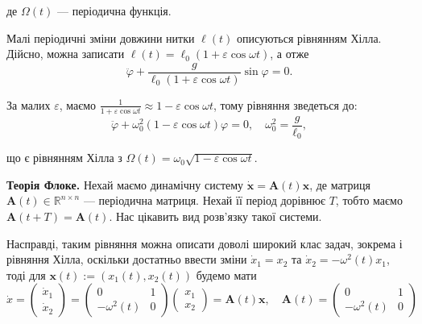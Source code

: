 \documentclass{hw_template}
\begin{document}
де $\Omega(t)$ --- періодична функція. 

\begin{example} Малі періодичні зміни довжини нитки $\ell(t)$ описуються
рівнянням Хілла. Дійсно, можна записати $\ell(t) = \ell_0(1+\varepsilon \cos
\omega t)$, а отже
\begin{equation*}
    \ddot{\varphi} + \frac{g}{\ell_0(1+\varepsilon \cos \omega t)}\sin\varphi = 0.
\end{equation*}

За малих $\varepsilon$, маємо $\frac{1}{1+\varepsilon \cos \omega t} \approx 1 -
\varepsilon \cos \omega t$, тому рівняння зведеться до:
\begin{equation*}
    \ddot{\varphi} + \omega_0^2(1-\varepsilon \cos \omega t)\varphi = 0, \quad \omega_0^2 = \frac{g}{\ell_0},
\end{equation*}

що є рівнянням Хілла з $\Omega(t) = \omega_0\sqrt{1-\varepsilon \cos \omega t}$.
\end{example}

\textbf{Теорія Флоке.} Нехай маємо динамічну систему $\dot{\mathbf{x}} =
\mathbf{A}(t)\mathbf{x}$, де матриця $\mathbf{A}(t) \in \mathbb{R}^{n \times n}$
--- періодична матриця. Нехай її період дорівнює $T$, тобто маємо
$\mathbf{A}(t+T) = \mathbf{A}(t)$. Нас цікавить вид розв'язку такої системи.

\begin{remark} Насправді, таким рівняння можна описати доволі широкий клас
задач, зокрема і рівняння Хілла, оскільки достатньо ввести зміни $\dot{x}_1=x_2$
та $\dot{x}_2 = -\omega^2(t)x_1$, тоді для $\mathbf{x}(t) := (x_1(t),x_2(t))$
будемо мати
\begin{equation*}
    \dot{x} = \begin{pmatrix}
        \dot{x}_1 \\ \dot{x}_2
    \end{pmatrix} = 
    \begin{pmatrix}
        0 & 1 \\ -\omega^2(t) & 0
    \end{pmatrix}
    \begin{pmatrix}
        x_1 \\ x_2
    \end{pmatrix} = \mathbf{A}(t)\mathbf{x}, \quad \mathbf{A}(t) = \begin{pmatrix}
        0 & 1 \\ -\omega^2(t) & 0
    \end{pmatrix}
\end{equation*}
\end{remark}
\end{document}
